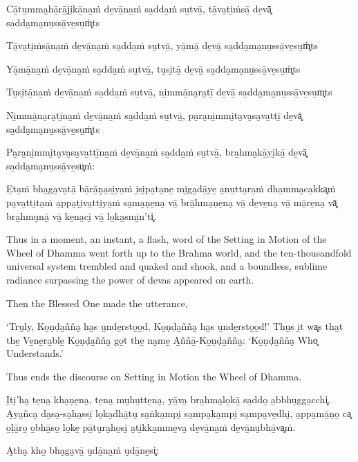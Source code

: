 Cā̱tu̱mma̮hā̱rā̱ji̮kā̱na̱ṁ de̱vā̱na̱ṁ sa̱dda̱ṁ su̱tvā̱, tā̱va̮ti̱ṁsā̱ de̱vā͓
sa̱dda̮ma̮nu̱ssā̱ve̱su̱ṁ\ldo͓ts

Tā̱va̮ti̱ṁsā̱na̱ṁ de̱vā̱na̱ṁ sa̱dda̱ṁ su̱tvā̱, yā̱mā̱ de̱vā̱ sa̱dda̮ma̮nu̱ssā̱ve̱su̱ṁ\ldo͓ts

Yā̱mā̱na̱ṁ de̱vā̱na̱ṁ sa̱dda̱ṁ su̱tvā̱, tu̮si̮tā̱ de̱vā̱ sa̱dda̮ma̮nu̱ssā̱ve̱su̱ṁ\ldo͓ts

Tu̮si̮tā̱na̱ṁ de̱vā̱na̱ṁ sa̱dda̱ṁ su̱tvā̱, ni̱mmā̱na̮ra̮tī̱ de̱vā̱ sa̱dda̮ma̮nu̱ssā̱ve̱su̱m\ldo͓ts

Ni̱mmā̱na̮ra̮tī̱na̱ṁ de̱vā̱na̱ṁ sa̱dda̱ṁ su̱tvā̱, pa̮ra̮ni̱mmi̮ta̮va̮sa̮va̱ttī̱ de̱vā͓
sa̱dda̮ma̮nu̱ssā̱ve̱su̱ṁ\ldo͓ts

Pa̮ra̮ni̱mmi̮ta̮va̮sa̮va̱ttī̱na̱ṁ de̱vā̱na̱ṁ sa̱dda̱ṁ su̱tvā̱, bra̱hma̮kā̱yi̮kā̱ de̱vā͓
sa̱dda̮ma̮nu̱ssā̱ve̱su͓ṁ:

E̱ta̱ṁ bha̮ga̮va̮tā̱ bā̱rā̱ṇa̮si̮ya̱ṁ i̮si̮pa̮ta̮ne̱ mi̮ga̮dā̱ye̱ a̮nu̱tta̮ra̱ṁ dha̱mma̮ca̱kka͓ṁ
pa̮va̱tti̮ta̱ṁ a̱ppa̮ṭi̮va̱tti̮ya̱ṁ sa̮ma̮ṇe̱na̮ vā̱ brā̱hma̮ṇe̱na̮ vā̱ de̱ve̱na̮ vā̱ mā̱re̱na̮ vā͓
bra̱hmu̮nā̱ vā̱ ke̱na̮ci̮ vā̱ lo̱ka̱smi̱n'ti͓.

\clearpage

\englishText
\markboth{\englishTitle}{\rightmark}

Thus in a moment, an instant, a flash, word of the Setting in Motion of
the Wheel of Dhamma went forth up to the Brahma world, and the
ten-thousandfold universal system trembled and quaked and shook, and a
boundless, sublime radiance surpassing the power of devas appeared on
earth.

Then the Blessed One made the utterance,

‘Tru̱ly, Ko̱ṇḍa̱ñña̮ ha̱s u̱nde̱rsto̱o̱d, Ko̱ṇḍa̱ñña̮ ha̱s u̱nde̱rsto̱o̱d!’ Thu̱s i̱t wa͓s
tha̱t the̱ Ve̱ne̱ra̱ble̱ Ko̱ṇḍa̱ñña̮ go̱t the̱ na̮me̱ A̱ññā̱-Ko̱ṇḍa̱ñña̮: ‘Ko̱ṇḍa̱ñña̮ Who͓
Understands.’

Thus ends the discourse on Setting in Motion the Wheel of Dhamma.

\clearpage

\paliText
\markboth{\paliTitle}{\rightmark}

I̮ti̮'ha̮ te̱na̮ kha̮ṇe̱na̮, te̱na̮ mu̮hu̱tte̱na̮, yā̱va̮ bra̱hma̮lo̱kā̱ sa̱ddo̱ a̱bbhu̱gga̱cchi͓.
A̮ya̱ñca̮ da̮sa̮-sa̮ha̱ssī̱ lo̱ka̮dhā̱tu̮ sa̱ṅka̱mpi̮ sa̱mpa̮ka̱mpi̮ sa̱mpa̮ve̱dhi̮, a̱ppa̮mā̱ṇo̱ ca͓
o̱ḷā̱ro̱ o̱bhā̱so̱ lo̱ke̱ pā̱tu̮ra̮ho̱si̮ a̮ti̱kka̱mme̱va̮ de̱vā̱na̱ṁ de̱vā̱nu̮bhā̱va͓ṁ.

A̮tha̮ kho̱ bha̮ga̮vā̱ u̮dā̱na̱ṁ u̮dā̱ne̱si͓:

